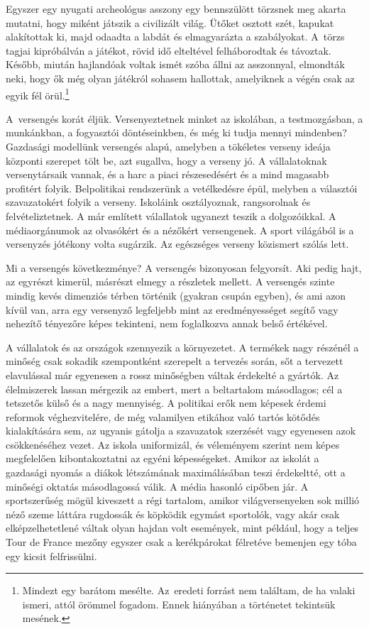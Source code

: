 \documentclass[12pt,a4paper]{article}
\begin{document}
Egyszer egy nyugati archeológus asszony egy bennszülött törzsnek meg akarta mutatni, hogy miként játszik a civilizált világ.
Ütőket osztott szét, kapukat alakítottak ki, majd odaadta a labdát és elmagyarázta a szabályokat.
A~törzs tagjai kipróbálván a játékot, rövid idő elteltével felháborodtak és távoztak.
Később, miután hajlandóak voltak ismét szóba állni az asszonnyal, elmondták neki, hogy ők még olyan játékról sohasem hallottak, amelyiknek a végén csak az egyik fél örül.\footnote[1]{Mindezt egy barátom mesélte. Az~eredeti forrást nem találtam, de ha valaki ismeri, attól örömmel fogadom. Ennek hiányában a történetet tekintsük mesének.}

A~versengés korát éljük.
Versenyeztetnek minket az iskolában, a testmozgásban, a munkánkban, a fogyasztói döntéseinkben, és még ki tudja mennyi mindenben?
Gazdasági modellünk versengés alapú, amelyben a tökéletes verseny ideája központi szerepet tölt be, azt sugallva, hogy a verseny jó.
A vállalatoknak versenytársaik vannak, és a harc a piaci részesedésért és a mind magasabb profitért folyik.
Belpolitikai rendszerünk a vetélkedésre épül, melyben a választói szavazatokért folyik a verseny.
Iskoláink osztályoznak, rangsorolnak és felvételiztetnek.
A már említett válallatok ugyanezt teszik a dolgozóikkal.
A médiaorgánumok az olvasókért és a nézőkért versengenek.
A sport világából is a versenyzés jótékony volta sugárzik.
Az egészséges verseny közismert szólás lett.

Mi a versengés következménye?
A versengés bizonyosan felgyorsít.
Aki pedig hajt, az egyrészt kimerül, másrészt elmegy a részletek mellett.
A versengés szinte mindig kevés dimenziós térben történik (gyakran csupán egyben), és ami azon kívül van, arra egy versenyző legfeljebb mint az eredményességet segítő vagy nehezítő tényezőre képes tekinteni, nem foglalkozva annak belső értékével.

A vállalatok és az országok szennyezik a környezetet.
A termékek nagy részénél a minőség csak sokadik szempontként szerepelt a tervezés során, sőt a tervezett elavulással már egyenesen a rossz minőségben váltak érdekelté a gyártók.
Az élelmiszerek lassan mérgezik az embert, mert a beltartalom másodlagos; cél a tetszetős külső és a nagy mennyiség.
A politikai erők nem képesek érdemi reformok véghezvitelére, de még valamilyen etikához való tartós kötődés kialakítására sem, az ugyanis gátolja a szavazatok szerzését vagy egyenesen azok csökkenéséhez vezet.
Az iskola uniformizál, és véleményem szerint nem képes megfelelően kibontakoztatni az egyéni képességeket.
Amikor az iskolát a gazdasági nyomás a diákok létszámának maximálásában teszi érdekeltté, ott a minőségi oktatás másodlagossá válik.
A média hasonló cipőben jár.
A sportszerűség mögül kiveszett a régi tartalom, amikor világversenyeken sok millió néző szeme láttára rugdossák és köpködik egymást sportolók, vagy akár csak elképzelhetetlené váltak olyan hajdan volt események, mint például, hogy a teljes Tour de France mezőny egyszer csak a kerékpárokat félretéve bemenjen egy tóba egy kicsit felfrissülni.
\end{document}

